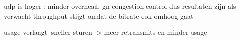 udp is hoger : minder overhead, gn congestion control dus resultaten zijn als verwacht
throughput stijgt omdat de bitrate ook omhoog gaat


usage verlaagt: sneller sturen -> meer retransmits en minder usage
